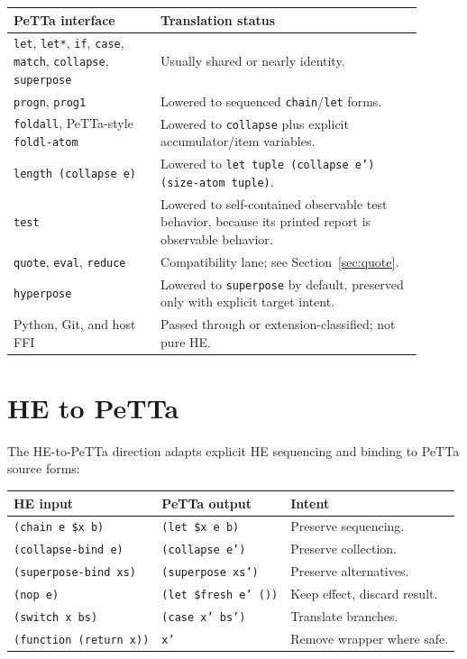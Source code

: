 \documentclass[11pt]{article}
\newcommand{\code}[1]{\texttt{#1}}
\newcommand{\HE}{\textup{HE}}
\newcommand{\PeTTa}{\textup{PeTTa}}
\begin{document}
\begin{longtable}{>{\raggedright\arraybackslash}p{0.32\linewidth}
                  >{\raggedright\arraybackslash}p{0.58\linewidth}}
\toprule
\PeTTa{} interface & Translation status \\
\midrule
\endhead
\code{let}, \code{let*}, \code{if}, \code{case}, \code{match},
\code{collapse}, \code{superpose} & Usually shared or nearly identity. \\
\code{progn}, \code{prog1} & Lowered to sequenced \code{chain}/\code{let}
forms. \\
\code{foldall}, \PeTTa{}-style \code{foldl-atom} & Lowered to
\code{collapse} plus explicit accumulator/item variables. \\
\code{length (collapse e)} & Lowered to \code{let tuple (collapse e')
(size-atom tuple)}. \\
\code{test} & Lowered to self-contained observable test behavior, because its
printed report is observable behavior. \\
\code{quote}, \code{eval}, \code{reduce} & Compatibility lane; see
Section~\ref{sec:quote}. \\
\code{hyperpose} & Lowered to \code{superpose} by default, preserved only with
explicit target intent. \\
Python, Git, and host FFI & Passed through or extension-classified; not pure
\HE{}. \\
\bottomrule
\end{longtable}

\section{\HE{} to \PeTTa{}}

The \HE{}-to-\PeTTa{} direction adapts explicit \HE{} sequencing and binding to
\PeTTa{} source forms:

\begin{center}
\begin{tabular}{lll}
\toprule
\HE{} input & \PeTTa{} output & Intent \\
\midrule
\code{(chain e \$x b)} & \code{(let \$x e b)} & Preserve sequencing. \\
\code{(collapse-bind e)} & \code{(collapse e')} & Preserve collection. \\
\code{(superpose-bind xs)} & \code{(superpose xs')} & Preserve alternatives. \\
\code{(nop e)} & \code{(let \$fresh e' ())} & Keep effect, discard result. \\
\code{(switch x bs)} & \code{(case x' bs')} & Translate branches. \\
\code{(function (return x))} & \code{x'} & Remove wrapper where safe. \\
\bottomrule
\end{tabular}
\end{center}
\end{document}
